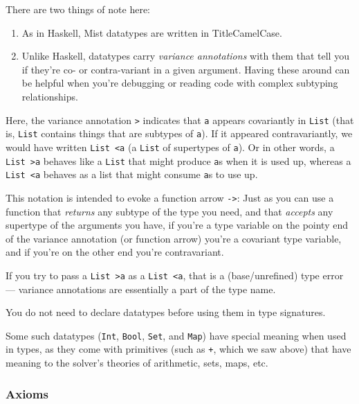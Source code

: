 \documentclass[
]{darts-v2021}
\begin{document}
There are two things of note here:

\begin{enumerate}
\def\labelenumi{\arabic{enumi}.}
\item
  As in Haskell, Mist datatypes are written in TitleCamelCase.
\item
  Unlike Haskell, datatypes carry \emph{variance annotations} with them
  that tell you if they're co- or contra-variant in a given argument.
  Having these around can be helpful when you're debugging or reading
  code with complex subtyping relationships.
\end{enumerate}

Here, the variance annotation \texttt{\textgreater{}} indicates that
\texttt{a} appears covariantly in \texttt{List} (that is, \texttt{List}
contains things that are subtypes of \texttt{a}). If it appeared
contravariantly, we would have written \texttt{List\ \textless{}a} (a
\texttt{List} of supertypes of \texttt{a}). Or in other words, a
\texttt{List\ \textgreater{}a} behaves like a \texttt{List} that might
produce \texttt{a}s when it is used up, whereas a
\texttt{List\ \textless{}a} behaves as a list that might consume
\texttt{a}s to use up.

This notation is intended to evoke a function arrow
\texttt{-\textgreater{}}: Just as you can use a function that
\emph{returns} any subtype of the type you need, and that \emph{accepts}
any supertype of the arguments you have, if you're a type variable on
the pointy end of the variance annotation (or function arrow) you're a
covariant type variable, and if you're on the other end you're
contravariant.

If you try to pass a \texttt{List\ \textgreater{}a} as a
\texttt{List\ \textless{}a}, that is a (base/unrefined) type error ---
variance annotations are essentially a part of the type name.

You do not need to declare datatypes before using them in type
signatures.

Some such datatypes (\texttt{Int}, \texttt{Bool}, \texttt{Set}, and
\texttt{Map}) have special meaning when used in types, as they come with
primitives (such as \texttt{+}, which we saw above) that have meaning to
the solver's theories of arithmetic, sets, maps, etc.

\hypertarget{axioms}{%
\subsubsection{Axioms}\label{axioms}}
\end{document}
